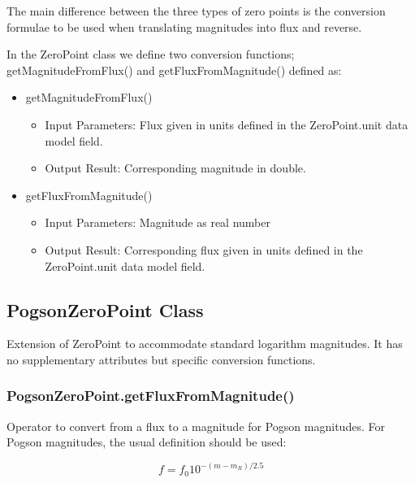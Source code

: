 \documentclass[11pt,a4paper]{ivoa}
\begin{document}

The main difference between the three types of zero points is the
conversion formulae to be used when translating magnitudes into flux and
reverse.\par

In the ZeroPoint class we define two conversion functions;
getMagnitudeFromFlux() and getFluxFromMagnitude() defined as:\par

\begin{itemize}
	\item getMagnitudeFromFlux()\par

\begin{itemize}
	\item{Input Parameters: Flux given in units defined in the
	ZeroPoint.unit data model field.\par}

	\item{Output Result: Corresponding magnitude in double.\par}


\vspace{\baselineskip}

\end{itemize}
	\item  getFluxFromMagnitude()\par

\begin{itemize}
	\item{Input Parameters: Magnitude as real number\par}

	\item{Output Result: Corresponding flux given in units defined in
	the ZeroPoint.unit data model field.}
\end{itemize}
\end{itemize}
\par


\subsection{PogsonZeroPoint Class}
\label{sect:Pogson}
Extension of ZeroPoint to accommodate standard logarithm magnitudes. It
has no supplementary attributes but specific conversion functions.
\par

\subsubsection{PogsonZeroPoint.getFluxFromMagnitude()}
Operator to convert from a flux to a magnitude for Pogson magnitudes. For
Pogson magnitudes, the usual definition should be used:
\par
\begin{equation} \label{eq:25}
f = f_0 10^{-(m-m_R)/2.5}
\end{equation}
\end{document}
